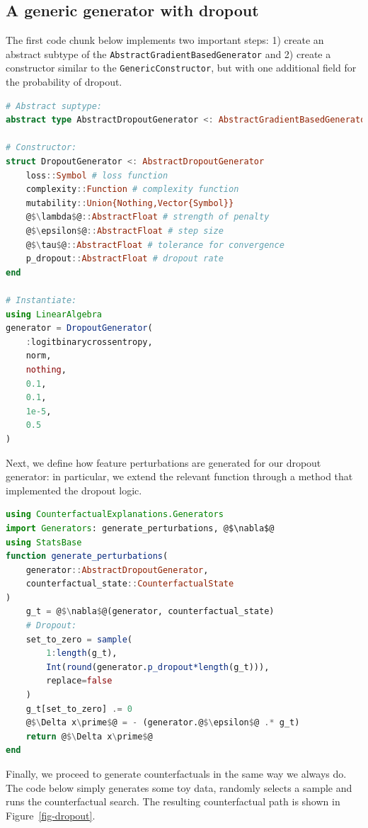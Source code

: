 \documentclass{juliacon}
\begin{document}
\hypertarget{a-generic-generator-with-dropout}{%
\subsection{A generic generator with
dropout}\label{a-generic-generator-with-dropout}}

The first code chunk below implements two important steps: 1) create an
abstract subtype of the \texttt{AbstractGradientBasedGenerator} and 2)
create a constructor similar to the \texttt{GenericConstructor}, but
with one additional field for the probability of dropout.

\begin{lstlisting}[language=Julia, escapechar=@]
# Abstract suptype:
abstract type AbstractDropoutGenerator <: AbstractGradientBasedGenerator end

# Constructor:
struct DropoutGenerator <: AbstractDropoutGenerator
    loss::Symbol # loss function
    complexity::Function # complexity function
    mutability::Union{Nothing,Vector{Symbol}}
    @$\lambda$@::AbstractFloat # strength of penalty
    @$\epsilon$@::AbstractFloat # step size
    @$\tau$@::AbstractFloat # tolerance for convergence
    p_dropout::AbstractFloat # dropout rate
end

# Instantiate:
using LinearAlgebra
generator = DropoutGenerator(
    :logitbinarycrossentropy,
    norm,
    nothing,
    0.1,
    0.1,
    1e-5,
    0.5
)
\end{lstlisting}

Next, we define how feature perturbations are generated for our dropout
generator: in particular, we extend the relevant function through a
method that implemented the dropout logic.

\begin{lstlisting}[language=Julia, escapechar=@]
using CounterfactualExplanations.Generators
import Generators: generate_perturbations, @$\nabla$@
using StatsBase
function generate_perturbations(
    generator::AbstractDropoutGenerator, 
    counterfactual_state::CounterfactualState
)
    g_t = @$\nabla$@(generator, counterfactual_state) 
    # Dropout:
    set_to_zero = sample(
        1:length(g_t),
        Int(round(generator.p_dropout*length(g_t))),
        replace=false
    )
    g_t[set_to_zero] .= 0
    @$\Delta x\prime$@ = - (generator.@$\epsilon$@ .* g_t) 
    return @$\Delta x\prime$@
end
\end{lstlisting}

Finally, we proceed to generate counterfactuals in the same way we
always do. The code below simply generates some toy data, randomly
selects a sample and runs the counterfactual search. The resulting
counterfactual path is shown in Figure~\ref{fig-dropout}.
\end{document}
